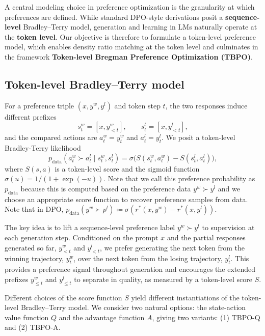 \documentclass{article}
\theoremstyle{plain}
\theoremstyle{definition}
\theoremstyle{remark}
\begin{document}
A central modeling choice in preference optimization is the granularity at which preferences are defined. While standard DPO-style derivations posit a \textbf{sequence-level} Bradley–Terry model, generation and learning in LMs naturally operate at the \textbf{token level}. Our objective is therefore to formulate a token-level preference model, which enables density ratio matching at the token level and culminates in the framework \textbf{Token-level Bregman Preference Optimization (TBPO)}.

\subsection{Token-level Bradley--Terry model}
\label{sec:token_bt}
For a preference triple $(x,y^w,y^l)$ and token step $t$, the two responses induce different prefixes
\begin{equation}
s_t^w = [x,y^w_{<t}],\qquad s_t^l = [x,y^l_{<t}],
\end{equation}
and the compared actions are $a_t^w=y_t^w$ and $a_t^l=y_t^l$.
We posit a token-level Bradley-Terry likelihood
\begin{equation}
 p_{\text{data}}(a_t^w \succ a_t^l \mid s_t^w,s_t^l)
=
\sigma\!\Big(S(s_t^w,a_t^w)-S(s_t^l,a_t^l)\Big),
\label{eq:bt_token}
\end{equation}
where $S(s,a)$ is a token-level score and the sigmoid function $\sigma(u)=1/(1+\exp(-u))$. Note that we call this preference probability as $p_{\text{data}}$ because  this is computed based on the preference data $y^w \succ y^l$ and we choose an appropriate score function to recover preference samples from data. Note that in DPO, $p_{\text{data}}\left(y^{w}\succ p^{l}\right)\coloneqq\sigma\left(r^{*}\left(x,y^{w}\right)-r^{*}\left(x,y^{l}\right)\right)$. 

The key idea is to lift a sequence-level preference label $y^w \succ y^l$ to supervision at each generation step. Conditioned on the prompt $x$ and the partial responses generated so far, $y^w_{<t}$ and $y^l_{<t}$, we prefer generating the next token from the winning trajectory, $y^w_t$, over the next token from the losing trajectory, $y^l_t$. This provides a preference signal throughout generation and encourages the extended prefixes $y^w_{\le t}$ and $y^l_{\le t}$ to separate in quality, as measured by a token-level score $S$.

Different choices of the score function $S$ yield different instantiations of the token-level Bradley--Terry model. We consider two natural options: the state-action value function $Q$ and the advantage function $A$, giving two variants: (1) TBPO-Q and (2) TBPO-A.
\end{document}
